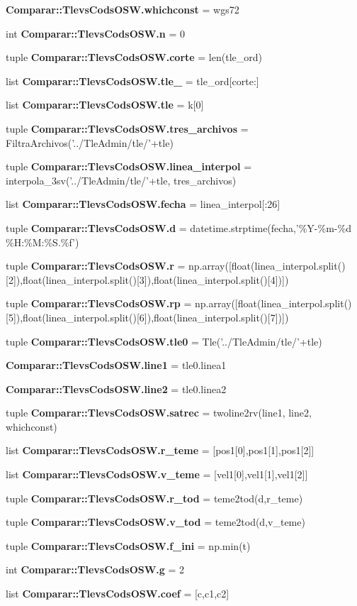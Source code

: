 \begin{DoxyCompactItemize}
\item 
{\bf \-Comparar\-::\-Tlevs\-Cods\-O\-S\-W.\-whichconst} = wgs72
\item 
int {\bf \-Comparar\-::\-Tlevs\-Cods\-O\-S\-W.\-n} = 0
\item 
tuple {\bf \-Comparar\-::\-Tlevs\-Cods\-O\-S\-W.\-corte} = len(tle\-\_\-ord)
\item 
list {\bf \-Comparar\-::\-Tlevs\-Cods\-O\-S\-W.\-tle\-\_} = tle\-\_\-ord[corte\-:]
\item 
list {\bf \-Comparar\-::\-Tlevs\-Cods\-O\-S\-W.\-tle} = k[0]
\item 
tuple {\bf \-Comparar\-::\-Tlevs\-Cods\-O\-S\-W.\-tres\-\_\-archivos} = \-Filtra\-Archivos('../\-Tle\-Admin/tle/'+tle)
\item 
tuple {\bf \-Comparar\-::\-Tlevs\-Cods\-O\-S\-W.\-linea\-\_\-interpol} = interpola\-\_\-3sv('../\-Tle\-Admin/tle/'+tle, tres\-\_\-archivos)
\item 
list {\bf \-Comparar\-::\-Tlevs\-Cods\-O\-S\-W.\-fecha} = linea\-\_\-interpol[\-:26]
\item 
tuple {\bf \-Comparar\-::\-Tlevs\-Cods\-O\-S\-W.\-d} = datetime.\-strptime(fecha,'\%\-Y-\/\%m-\/\%d \%\-H\-:\%\-M\-:\%\-S.\%f')
\item 
tuple {\bf \-Comparar\-::\-Tlevs\-Cods\-O\-S\-W.\-r} = np.\-array([float(linea\-\_\-interpol.\-split()[2]),float(linea\-\_\-interpol.\-split()[3]),float(linea\-\_\-interpol.\-split()[4])])
\item 
tuple {\bf \-Comparar\-::\-Tlevs\-Cods\-O\-S\-W.\-rp} = np.\-array([float(linea\-\_\-interpol.\-split()[5]),float(linea\-\_\-interpol.\-split()[6]),float(linea\-\_\-interpol.\-split()[7])])
\item 
tuple {\bf \-Comparar\-::\-Tlevs\-Cods\-O\-S\-W.\-tle0} = \-Tle('../\-Tle\-Admin/tle/'+tle)
\item 
{\bf \-Comparar\-::\-Tlevs\-Cods\-O\-S\-W.\-line1} = tle0.\-linea1
\item 
{\bf \-Comparar\-::\-Tlevs\-Cods\-O\-S\-W.\-line2} = tle0.\-linea2
\item 
tuple {\bf \-Comparar\-::\-Tlevs\-Cods\-O\-S\-W.\-satrec} = twoline2rv(line1, line2, whichconst)
\item 
list {\bf \-Comparar\-::\-Tlevs\-Cods\-O\-S\-W.\-r\-\_\-teme} = [pos1[0],pos1[1],pos1[2]]
\item 
list {\bf \-Comparar\-::\-Tlevs\-Cods\-O\-S\-W.\-v\-\_\-teme} = [vel1[0],vel1[1],vel1[2]]
\item 
tuple {\bf \-Comparar\-::\-Tlevs\-Cods\-O\-S\-W.\-r\-\_\-tod} = teme2tod(d,r\-\_\-teme)
\item 
tuple {\bf \-Comparar\-::\-Tlevs\-Cods\-O\-S\-W.\-v\-\_\-tod} = teme2tod(d,v\-\_\-teme)
\item 
tuple {\bf \-Comparar\-::\-Tlevs\-Cods\-O\-S\-W.\-f\-\_\-ini} = np.\-min(t)
\item 
int {\bf \-Comparar\-::\-Tlevs\-Cods\-O\-S\-W.\-g} = 2
\item 
list {\bf \-Comparar\-::\-Tlevs\-Cods\-O\-S\-W.\-coef} = [c,c1,c2]
\end{DoxyCompactItemize}
